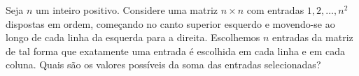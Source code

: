 Seja \( n\) um inteiro positivo. Considere uma matriz \( n\times n\) com entradas \( 1,2,\dots,n^2\) dispostas em ordem, começando no canto superior esquerdo e movendo-se ao longo de cada linha da esquerda para a direita. 
Escolhemos \( n\) entradas da matriz de tal forma que exatamente uma entrada é escolhida em cada linha e em cada coluna. Quais são os valores possíveis da soma das entradas selecionadas?
